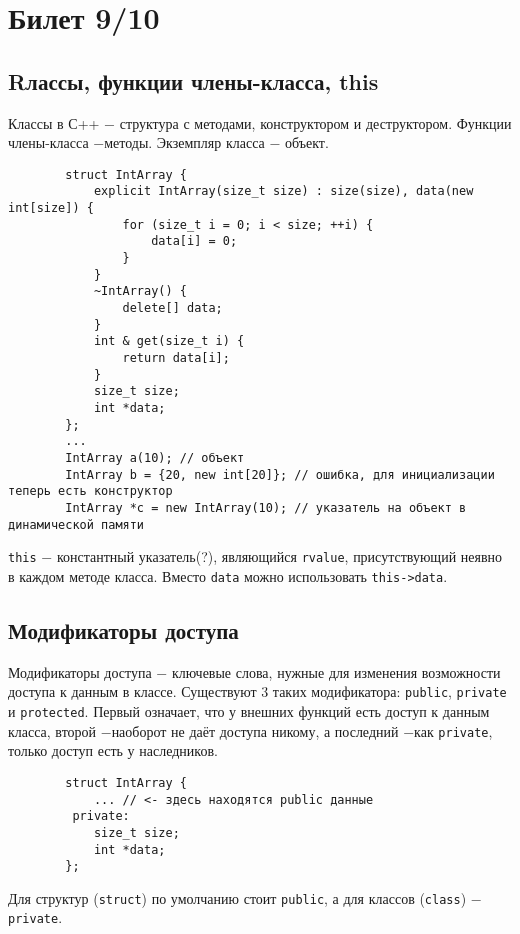 \documentclass[15pt, a4paper]{article}
\newcommand{\nl}{\newline}
\begin{document}
    \section{Билет 9/10}
\subsection{Rлассы, функции члены-класса, this}
    Классы в С++ $-$ структура с методами, конструктором и деструктором.\nl
    Функции члены-класса $-$методы.\nl
    Экземпляр класса $-$ объект.\nl
    \begin{verbatim}
        struct IntArray {
            explicit IntArray(size_t size) : size(size), data(new int[size]) {
                for (size_t i = 0; i < size; ++i) {
                    data[i] = 0;
                }
            }
            ~IntArray() {
                delete[] data;
            }
            int & get(size_t i) {
                return data[i];
            }
            size_t size;
            int *data;
        };
        ...
        IntArray a(10); // объект
        IntArray b = {20, new int[20]}; // ошибка, для инициализации теперь есть конструктор
        IntArray *c = new IntArray(10); // указатель на объект в динамической памяти
    \end{verbatim}
    \texttt{this} $-$ константный указатель(?), являющийся \texttt{rvalue}, присутствующий неявно в каждом
    методе класса. Вместо \texttt{data} можно использовать \texttt{this->data}.
  \subsection{Модификаторы доступа}
    Модификаторы доступа $-$ ключевые слова, нужные для изменения возможности доступа к данным в классе.
    \nl
    Существуют 3 таких модификатора: \texttt{public}, \texttt{private} и \texttt{protected}. Первый означает, что у
    внешних функций есть доступ к данным класса, второй $-$наоборот не даёт доступа никому, а последний $-$как
    \texttt{private}, только доступ есть у наследников.\nl
    \begin{verbatim}
        struct IntArray {
            ... // <- здесь находятся public данные
         private:
            size_t size;
            int *data;
        };
    \end{verbatim}
    Для структур (\texttt{struct}) по умолчанию стоит \texttt{public}, а для классов (\texttt{class}) $-$\texttt{private}.
\end{document}
